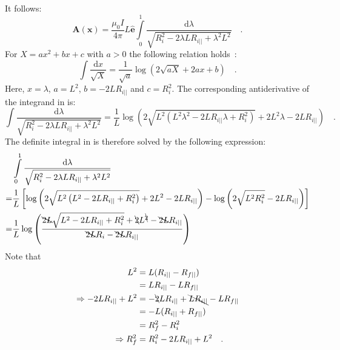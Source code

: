 It follows:
\begin{equation}
 \mathbf{A}(\mathbf{x})
 = \frac{\mu_0 I}{4 \pi} L \hat{\mathbf{e}} \int\limits_0^1 \frac{\mathrm{d}\lambda}{\sqrt{R_i^2 - 2 \lambda L R_{i ||} + \lambda^2 L^2}} \quad . \label{eqn:A_integral}
\end{equation}
For $X = a x^2 + b x + c$ with $a>0$ the following relation holds~\cite{bronstein}:
\begin{equation}
 \int \frac{\mathrm{d}x}{\sqrt{X}} = \frac{1}{\sqrt{a}} \log \left( 2 \sqrt{a X} + 2 a x + b \right) \quad .
\end{equation}
Here, $x = \lambda$, $a = L^2$, $b=-2 L R_{i ||}$ and $c=R_i^2$.
The corresponding antiderivative of the integrand in  is:
\begin{equation}
   \int\frac{\mathrm{d}\lambda}{\sqrt{R_i^2 - 2 \lambda L R_{i ||} + \lambda^2 L^2}}
 = \frac{1}{L} \log \left( 2 \sqrt{L^2\left( L^2 \lambda^2 - 2 L R_{i ||} \lambda + R_i^2 \right)} + 2 L^2 \lambda - 2 L R_{i ||} \right) \quad .
\end{equation}
The definite integral in  is therefore solved by the following expression:
\begin{align}
 ~ & \int\limits_0^1 \frac{\mathrm{d}\lambda}{\sqrt{R_i^2 - 2 \lambda L R_{i ||} + \lambda^2 L^2}} \\
 = & \frac{1}{L} \left[ \log \left( 2 \sqrt{L^2\left( L^2 - 2 L R_{i ||} + R_i^2 \right)} + 2 L^2 - 2 L R_{i ||} \right) - \log \left( 2 \sqrt{L^2 R_i^2 } - 2 L R_{i ||} \right) \right] \\
 = & \frac{1}{L} \log \left( \frac{ \bcancel{2 L} \sqrt{L^2 - 2 L R_{i ||} + R_i^2} + \bcancel{2} L^{\bcancel{2}} - \bcancel{2 L} R_{i ||} }{ \bcancel{2 L} R_i - \bcancel{2 L} R_{i ||} } \right)
\end{align}
Note that
\begin{align}
                             L^2 & = L (R_{i ||} - R_{f ||} ) \\
                              ~  & = L R_{i ||} - L R_{f ||} \\
\Rightarrow -2 L R_{i ||} + L^2  & = - \bcancel{2} L R_{i ||}  + \bcancel{L R_{i ||}} - L R_{f ||} \\
                              ~  & = -L (R_{i ||} + R_{f ||} ) \\
                              ~  & = R_f^2 - R_i^2 \\
\Rightarrow                R_f^2 & = R_i^2 -2 L R_{i ||} + L^2 \quad .
\end{align}
